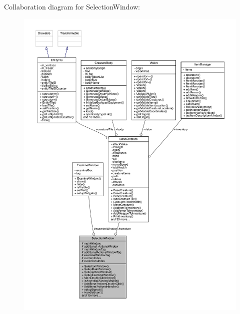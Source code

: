 Collaboration diagram for Selection\+Window\+:
\nopagebreak
\begin{figure}[H]
\begin{center}
\leavevmode
\includegraphics[width=350pt]{d4/db5/class_selection_window__coll__graph}
\end{center}
\end{figure}
